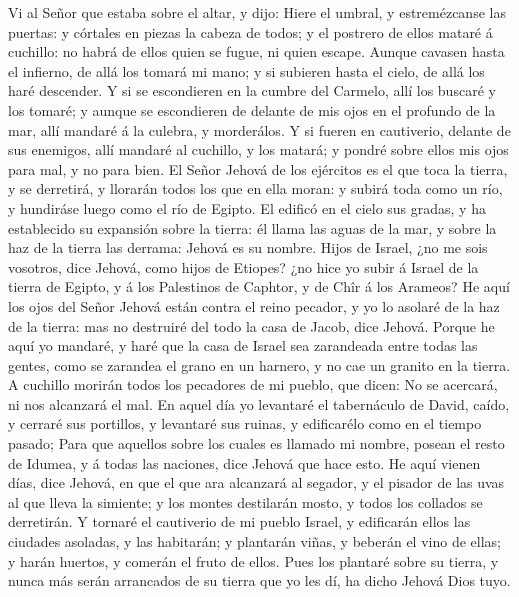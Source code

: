  Vi al Señor que estaba sobre el altar, y dijo: Hiere el
umbral, y estremézcanse las puertas: y córtales en piezas la cabeza de
todos; y el postrero de ellos mataré á cuchillo: no habrá de ellos quien
se fugue, ni quien escape.  Aunque cavasen hasta el
infierno, de allá los tomará mi mano; y si subieren hasta el cielo, de
allá los haré descender.  Y si se escondieren en la cumbre
del Carmelo, allí los buscaré y los tomaré; y aunque se escondieren de
delante de mis ojos en el profundo de la mar, allí mandaré á la culebra,
y morderálos.  Y si fueren en cautiverio, delante de sus
enemigos, allí mandaré al cuchillo, y los matará; y pondré sobre ellos
mis ojos para mal, y no para bien.  El Señor Jehová de los
ejércitos es el que toca la tierra, y se derretirá, y llorarán todos los
que en ella moran: y subirá toda como un río, y hundiráse luego como el
río de Egipto.  El edificó en el cielo sus gradas, y ha
establecido su expansión sobre la tierra: él llama las aguas de la mar,
y sobre la haz de la tierra las derrama: Jehová es su nombre.
 Hijos de Israel, ¿no me sois vosotros, dice Jehová, como
hijos de Etiopes? ¿no hice yo subir á Israel de la tierra de Egipto, y á
los Palestinos de Caphtor, y de Chîr á los Arameos?  He aquí
los ojos del Señor Jehová están contra el reino pecador, y yo lo asolaré
de la haz de la tierra: mas no destruiré del todo la casa de Jacob, dice
Jehová.  Porque he aquí yo mandaré, y haré que la casa de
Israel sea zarandeada entre todas las gentes, como se zarandea el grano
en un harnero, y no cae un granito en la tierra.  A
cuchillo morirán todos los pecadores de mi pueblo, que dicen: No se
acercará, ni nos alcanzará el mal.  En aquel día yo
levantaré el tabernáculo de David, caído, y cerraré sus portillos, y
levantaré sus ruinas, y edificarélo como en el tiempo pasado;
 Para que aquellos sobre los cuales es llamado mi nombre,
posean el resto de Idumea, y á todas las naciones, dice Jehová que hace
esto.  He aquí vienen días, dice Jehová, en que el que ara
alcanzará al segador, y el pisador de las uvas al que lleva la simiente;
y los montes destilarán mosto, y todos los collados se derretirán.
 Y tornaré el cautiverio de mi pueblo Israel, y edificarán
ellos las ciudades asoladas, y las habitarán; y plantarán viñas, y
beberán el vino de ellas; y harán huertos, y comerán el fruto de ellos.
 Pues los plantaré sobre su tierra, y nunca más serán
arrancados de su tierra que yo les dí, ha dicho Jehová Dios tuyo.
